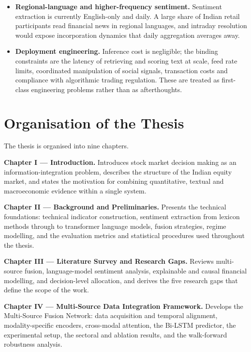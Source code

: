 \begin{itemize}
\item \textbf{Regional-language and higher-frequency sentiment.} Sentiment extraction is
currently English-only and daily. A large share of Indian retail participants read
financial news in regional languages, and intraday resolution would expose incorporation
dynamics that daily aggregation averages away.

\item \textbf{Deployment engineering.} Inference cost is negligible; the binding
constraints are the latency of retrieving and scoring text at scale, feed rate limits,
coordinated manipulation of social signals, transaction costs and compliance with
algorithmic trading regulation. These are treated as first-class engineering problems
rather than as afterthoughts.
\end{itemize}

\chapter{Organisation of the Thesis}

The thesis is organised into nine chapters.

\textbf{Chapter I --- Introduction.} Introduces stock market decision making as an
information-integration problem, describes the structure of the Indian equity market, and
states the motivation for combining quantitative, textual and macroeconomic evidence
within a single system.

\textbf{Chapter II --- Background and Preliminaries.} Presents the technical foundations:
technical indicator construction, sentiment extraction from lexicon methods through to
transformer language models, fusion strategies, regime modelling, and the evaluation
metrics and statistical procedures used throughout the thesis.

\textbf{Chapter III --- Literature Survey and Research Gaps.} Reviews multi-source fusion,
language-model sentiment analysis, explainable and causal financial modelling, and
decision-level allocation, and derives the five research gaps that define the scope of the
work.

\textbf{Chapter IV --- Multi-Source Data Integration Framework.} Develops the
Multi-Source Fusion Network: data acquisition and temporal alignment, modality-specific
encoders, cross-modal attention, the Bi-LSTM predictor, the experimental setup, the
sectoral and ablation results, and the walk-forward robustness analysis.

